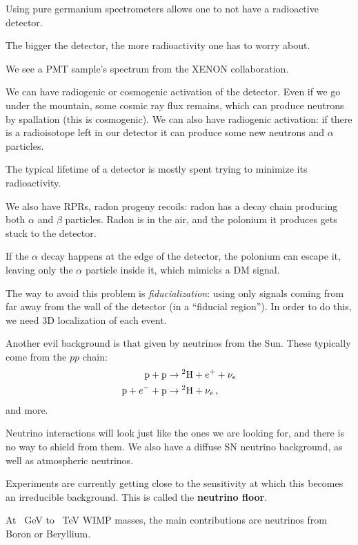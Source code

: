 \documentclass[main.tex]{subfiles}
\begin{document}

Using pure germanium spectrometers allows one to not have a radioactive detector. 

The bigger the detector, the more radioactivity one has to worry about. 

We see a PMT sample's spectrum from the XENON collaboration. 

We can have radiogenic or cosmogenic activation of the detector. 
Even if we go under the mountain, some cosmic ray flux remains, which can produce neutrons by spallation (this is cosmogenic). 
We can also have radiogenic activation: if there is a radioisotope left in our detector it can produce some new neutrons and \(\alpha \) particles. 

The typical lifetime of a detector is mostly spent trying to minimize its radioactivity. 

We also have RPRs, radon progeny recoils: radon has a decay chain producing both \(\alpha \) and \(\beta \) particles.
Radon is in the air, and the polonium it produces gets stuck to the detector. 

If the \(\alpha \) decay happens at the edge of the detector, the polonium can escape it, leaving only the \(\alpha \) particle inside it, which mimicks a DM signal. 

The way to avoid this problem is \emph{fiducialization}: using only signals coming from far away from the wall of the detector (in a ``fiducial region'').
In order to do this, we need 3D localization of each event. 

Another evil background is that given by neutrinos from the Sun. 
These typically come from the \(pp\) chain: 
%
\begin{align}
\ce{p} + \ce{p} &\to {}^{2}\ce{H} + e^{+} + \nu _e \\
\ce{p} + e^{-} + \ce{p} &\to {}^{2}\ce{H} + \nu _e 
\,,
\end{align}
%
and more.

Neutrino interactions will look just like the ones we are looking for, and there is no way to shield from them. 
We also have a diffuse SN neutrino background, as well as atmospheric neutrinos. 

Experiments are currently getting close to the sensitivity at which this becomes an irreducible background. 
This is called the \textbf{neutrino floor}. 

At \SI{}{GeV} to \SI{}{TeV} WIMP masses, the main contributions are neutrinos from Boron or Beryllium. 
\end{document}
